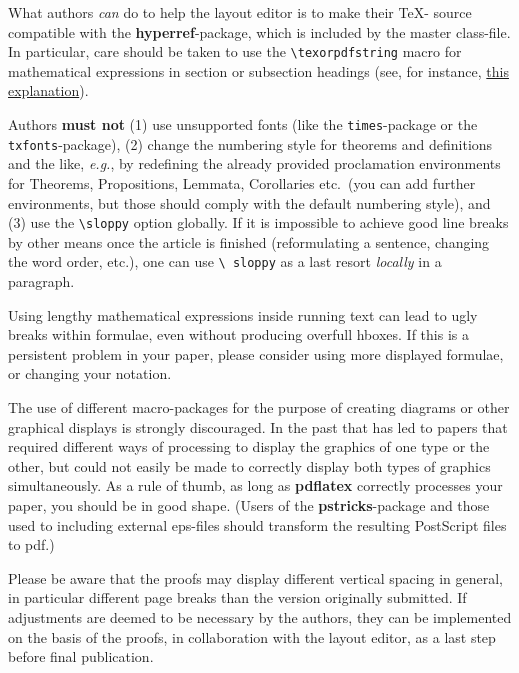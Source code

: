 \documentclass{jpc} %
\theoremstyle{plain}\newtheorem{satz}[thm]{Satz} %
\def\eg{{\em e.g.}}
\begin{document}
  What authors \emph{can} do to help the layout editor is to make
  their \TeX- source compatible with the {\bf hyperref}-package, which
  is included by the master class-file.  In particular, care should be
  taken to use the \texttt{\textbackslash texorpdfstring} macro for
  mathematical expressions in section or subsection headings (see, for
  instance, \href{http://www.fauskes.net/nb/latextips/#hyperref}{this
    explanation}).

  Authors \textbf{must not} (1) use unsupported fonts (like the
  \texttt{times}-package or the \texttt{txfonts}-package), (2) change
  the numbering style for theorems and definitions and the like, \eg,
  by redefining the already provided proclamation environments for
  Theorems, Propositions, Lemmata, Corollaries etc.\ (you can add
  further environments, but those should comply with the default
  numbering style), and (3) use the \texttt{\textbackslash sloppy}
  option globally.  If it is impossible to achieve good line breaks by
  other means once the article is finished (reformulating a sentence,
  changing the word order, etc.), one can use \texttt{\textbackslash
    sloppy} as a last resort \emph{locally} in a paragraph.

  Using lengthy mathematical expressions inside running text can lead
  to ugly breaks within formulae, even without producing overfull
  hboxes.  If this is a persistent problem in your paper, please
  consider using more displayed formulae, or changing your notation.

  The use of different macro-packages for the purpose of creating
  diagrams or other graphical displays is strongly discouraged.  In
  the past that has led to papers that required different ways of
  processing to display the graphics of one type or the other, but
  could not easily be made to correctly display both types of graphics
  simultaneously.  As a rule of thumb, as long as {\bf pdflatex}
  correctly processes your paper, you should be in good shape. (Users
  of the {\bf pstricks}-package and those used to including external
  eps-files should transform the resulting PostScript files to pdf.)

  Please be aware that the proofs may display different vertical
  spacing in general, in particular different page breaks than the
  version originally submitted.  If adjustments are deemed to be
  necessary by the authors, they can be implemented on the basis of
  the proofs, in collaboration with the layout editor, as a last step
  before final publication.
\end{document}
